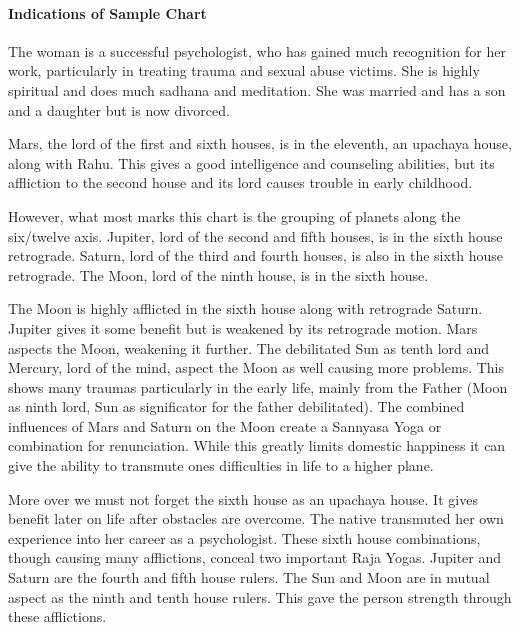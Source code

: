\paragraph{Indications of Sample Chart}

 

The woman is a successful psychologist, who has gained much recognition for her work, particularly in treating trauma and sexual abuse victims. She is highly spiritual and does much sadhana and meditation. She was married and has a son and a daughter but is now divorced.

 

Mars, the lord of the first and sixth houses, is in the eleventh, an upachaya house, along with Rahu. This gives a good intelligence and counseling abilities, but its affliction to the second house and its lord causes trouble in early childhood.

 

However, what most marks this chart is the grouping of planets along the six/twelve axis. Jupiter, lord of the second and fifth houses, is in the sixth house retrograde. Saturn, lord of the third and fourth houses, is also in the sixth house retrograde. The Moon, lord of the ninth house, is in the sixth house.

 

The Moon is highly afflicted in the sixth house along with retrograde Saturn. Jupiter gives it some benefit but is weakened by its retrograde motion. Mars aspects the Moon, weakening it further. The debilitated Sun as tenth lord and Mercury, lord of the mind, aspect the Moon as well causing more problems. This shows many traumas particularly in the early life, mainly from the Father (Moon as ninth lord, Sun as significator for the father debilitated). The combined influences of Mars and Saturn on the Moon create a Sannyasa Yoga or combination for renunciation. While this greatly limits domestic happiness it can give the ability to transmute ones difficulties in life to a higher plane.

 

More over we must not forget the sixth house as an upachaya house. It gives benefit later on life after obstacles are overcome. The native transmuted her own experience into her career as a psychologist. These sixth house combinations, though causing many afflictions, conceal two important Raja Yogas. Jupiter and Saturn are the fourth and fifth house rulers. The Sun and Moon are in mutual aspect as the ninth and tenth house rulers. This gave the person strength through these afflictions.

